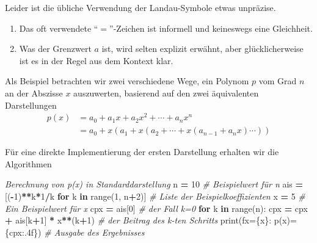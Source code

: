 \documentclass[
]{book}
\newenvironment{Shaded}{\begin{snugshade}}{\end{snugshade}}
\newcommand{\BuiltInTok}[1]{#1}
\newcommand{\CommentTok}[1]{\textcolor[rgb]{0.56,0.35,0.01}{\textit{#1}}}
\newcommand{\ControlFlowTok}[1]{\textcolor[rgb]{0.13,0.29,0.53}{\textbf{#1}}}
\newcommand{\DecValTok}[1]{\textcolor[rgb]{0.00,0.00,0.81}{#1}}
\newcommand{\KeywordTok}[1]{\textcolor[rgb]{0.13,0.29,0.53}{\textbf{#1}}}
\newcommand{\NormalTok}[1]{#1}
\newcommand{\OperatorTok}[1]{\textcolor[rgb]{0.81,0.36,0.00}{\textbf{#1}}}
\newcommand{\SpecialCharTok}[1]{\textcolor[rgb]{0.00,0.00,0.00}{#1}}
\newcommand{\SpecialStringTok}[1]{\textcolor[rgb]{0.31,0.60,0.02}{#1}}
\providecommand{\tightlist}{%
  \setlength{\itemsep}{0pt}\setlength{\parskip}{0pt}}
\theoremstyle{definition}
\theoremstyle{definition}
\theoremstyle{definition}
\theoremstyle{definition}
\theoremstyle{remark}
\begin{document}
Leider ist die übliche Verwendung der Landau-Symbole etwas unpräzise.

\begin{enumerate}
\def\labelenumi{\arabic{enumi}.}
\tightlist
\item
  Das oft verwendete ``\(=\)''-Zeichen ist informell und keineswegs eine Gleichheit.
\item
  Was der Grenzwert \(a\) ist, wird selten explizit erwähnt, aber glücklicherweise ist es in der Regel aus dem Kontext klar.
\end{enumerate}

Als Beispiel betrachten wir zwei verschiedene Wege, ein Polynom \(p\) vom Grad \(n\) an der Abszisse \(x\) auszuwerten, basierend auf den zwei äquivalenten Darstellungen
\begin{equation*}
\begin{split}
p(x) &= a_0 + a_1x +  a_2x^2+ \dotsm + a_nx^n \\
     &= a_0 + x(a_1 + x(a_2 + \dotsm +x(a_{n-1} + a_nx) \dotsm ))
\end{split}
\end{equation*}

Für eine direkte Implementierung der ersten Darstellung erhalten wir die Algorithmen

\begin{Shaded}
\begin{Highlighting}[]
\CommentTok{\textquotesingle{}\textquotesingle{}\textquotesingle{}Berechnung von p(x) in Standarddarstellung}
\CommentTok{\textquotesingle{}\textquotesingle{}\textquotesingle{}}
\NormalTok{n }\OperatorTok{=} \DecValTok{10}                                      \CommentTok{\# Beispielwert für n}
\NormalTok{ais }\OperatorTok{=}\NormalTok{ [(}\OperatorTok{{-}}\DecValTok{1}\NormalTok{)}\OperatorTok{**}\NormalTok{k}\OperatorTok{*}\DecValTok{1}\OperatorTok{/}\NormalTok{k }\ControlFlowTok{for}\NormalTok{ k }\KeywordTok{in} \BuiltInTok{range}\NormalTok{(}\DecValTok{1}\NormalTok{, n}\OperatorTok{+}\DecValTok{2}\NormalTok{)]  }\CommentTok{\# Liste der Beispielkoeffizienten}
\NormalTok{x }\OperatorTok{=} \DecValTok{5}                                       \CommentTok{\# Ein Beispielwert für x}
\NormalTok{cpx }\OperatorTok{=}\NormalTok{ ais[}\DecValTok{0}\NormalTok{]                                }\CommentTok{\# der Fall k=0}
\ControlFlowTok{for}\NormalTok{ k }\KeywordTok{in} \BuiltInTok{range}\NormalTok{(n):}
\NormalTok{    cpx }\OperatorTok{=}\NormalTok{ cpx }\OperatorTok{+}\NormalTok{ ais[k}\OperatorTok{+}\DecValTok{1}\NormalTok{] }\OperatorTok{*}\NormalTok{ x}\OperatorTok{**}\NormalTok{(k}\OperatorTok{+}\DecValTok{1}\NormalTok{)         }\CommentTok{\# der Beitrag des k{-}ten Schritts}
\BuiltInTok{print}\NormalTok{(}\SpecialStringTok{f\textquotesingle{}x=}\SpecialCharTok{\{x\}}\SpecialStringTok{: p(x)=}\SpecialCharTok{\{}\NormalTok{cpx}\SpecialCharTok{:.4f\}}\SpecialStringTok{\textquotesingle{}}\NormalTok{)             }\CommentTok{\# Ausgabe des Ergebnisses}
\end{Highlighting}
\end{Shaded}
\end{document}
